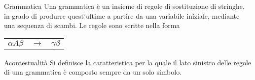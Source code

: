 \documentclass[a4paper, 12pt]{report}
\begin{document}
    \begin{frameddefn}{Grammatica}
        Una grammatica è un insieme di regole di sostituzione di stringhe, in grado di produrre quest'ultime a partire da una variabile iniziale, mediante una sequenza di scambi. Le regole sono scritte nella forma

        \begin{center}
            \begin{tabular}{rcl}
                $\alpha A \beta$ & $\to$ & $\gamma \beta$ \\
            \end{tabular}
        \end{center}
    \end{frameddefn}

    \begin{frameddefn}{Acontestualità}
        Si definisce  la caratteristica per la quale il lato sinistro delle regole di una grammatica è composto sempre da un solo simbolo.
    \end{frameddefn}
\end{document}
